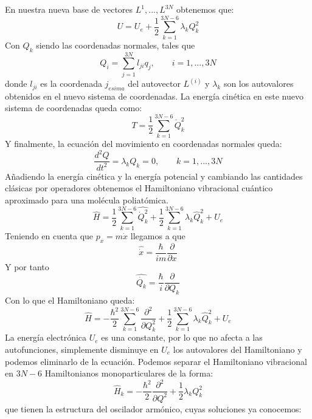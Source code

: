 \documentclass[a4paper]{article}
\begin{document}
En nuestra nueva base de vectores $L^{1},...,L^{3N}$ obtenemos que:
\begin{equation}
U=U_e + \frac{1}{2}\sum_{k=1}^{3N-6}\lambda_kQ_k^2
\end{equation}
Con $Q_k$ siendo las coordenadas normales, tales que
\begin{equation}
Q_i=\sum_{j=1}^{3N}l_{ji}q_j, \qquad i=1,...,3N
\end{equation}
donde $l_{ji}$ es la coordenada $j_{esima}$ del autovector $L^{(i)}$ y $\lambda_k$ son los autovalores obtenidos en el nuevo sistema de coordenadas.
La energía cinética en este nuevo sistema de coordenadas queda como:
\begin{equation}
T=\frac{1}{2}\sum_{k=1}^{3N-6}\dot Q_k^2
\end{equation}
Y finalmente, la ecuación del movimiento en coordenadas normales queda:
\begin{equation}
\frac{d^2Q}{dt^2}=\lambda_kQ_k=0, \qquad k=1,...,3N
\end{equation}
Añadiendo la energía cinética y la energía potencial y cambiando las cantidades clásicas por operadores obtenemos el Hamiltoniano vibracional cuántico aproximado para una molécula poliatómica.
\begin{equation}
\hat H= \frac{1}{2}\sum_{k=1}^{3N-6} \hat{\dot Q_k^2} + \frac{1}{2} \sum_{k=1}^{3N-6} \lambda_k \hat Q_k^2 + U_e
\end{equation}
Teniendo en cuenta que $p_x=m\dot x$ llegamos a que
$$\hat{\dot{x}}=\frac{\hbar}{im}\frac{\partial}{\partial x}$$
Y por tanto
\begin{equation}
\hat{\dot{Q_k}}=\frac{\hbar}{i}\frac{\partial}{\partial Q_k}
\end{equation}
Con lo que el Hamiltoniano queda:
\begin{equation}
\hat H= -\frac{\hbar^2}{2}\sum_{k=1}^{3N-6} \frac{\partial^2}{\partial Q^2_k} + \frac{1}{2} \sum_{k=1}^{3N-6} \lambda_k \hat Q_k^2 + U_e
\end{equation}
La energía electrónica $U_e$ es una constante, por lo que no afecta a las autofunciones, simplemente disminuye en $U_e$ los autovalores del Hamiltoniano y podemos eliminarlo de la ecuación. Podemos separar el Hamiltoniano vibracional en $3N-6$ Hamiltonianos monoparticulares de la forma:
\begin{equation}
\hat H_k = -\frac{\hbar^2}{2}\frac{\partial^2}{\partial Q^2}+\frac{1}{2}\lambda_kQ_k^2
\end{equation}
que tienen la estructura del oscilador armónico, cuyas soluciones ya conocemos:
\end{document}
